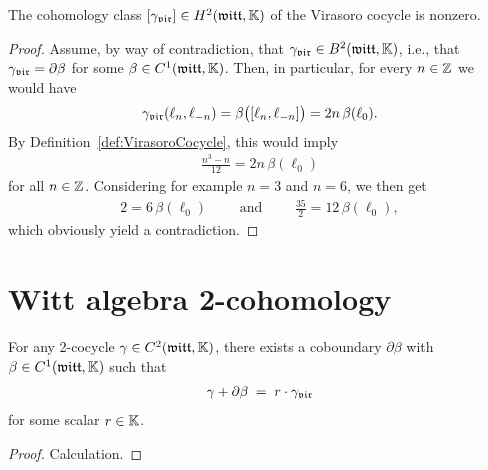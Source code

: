 \begin{lemma}
  \label{lem:VirasoroCocycleNontrivial}
  \leanok
  The cohomology class $[{\gamma}_{\mathfrak{vir}}] \in H^2(\mathfrak{witt},\mathbb{K})$
  of the Virasoro cocycle is nonzero.
\end{lemma}
\begin{proof}
  \leanok
  Assume, by way of contradiction, that ${\gamma}_{\mathfrak{vir}} \in B^2(\mathfrak{witt},\mathbb{K})$,
  i.e., that ${\gamma}_{\mathfrak{vir}} = \partial \beta$ for some $\beta \in C^1(\mathfrak{witt},\mathbb{K})$.
  Then, in particular, for every $n \in \mathbb{Z}$ we would have
  \begin{align*}
    {\gamma}_{\mathfrak{vir}}(\ell_n,\ell_{-n})
      = \beta \big( [\ell_n, \ell_{-n}] \big) = 2 n \, \beta ( \ell_0 ) .
  \end{align*}
  By Definition~\ref{def:VirasoroCocycle}, this would imply
  \begin{align*}
    \frac{n^3-n}{12} = 2 n \, \beta ( \ell_0 )
  \end{align*}
  for all $n \in \mathbb{Z}$. Considering for example $n=3$ and $n=6$, we then get
  \begin{align*}
    2 = 6 \, \beta (\ell_0)
    \qquad \text{ and } \qquad
    \frac{35}{2} = 12 \,  \beta (\ell_0) ,
  \end{align*}
  which obviously yield a contradiction.
\end{proof}

\section{Witt algebra 2-cohomology}

\begin{lemma}
  \label{lem:WittTwoCocycleNormalization}
  \leanok
  For any 2-cocycle $\gamma \in C^2(\mathfrak{witt},\mathbb{K})$, there exists
  a coboundary $\partial \beta$ with $\beta \in C^1(\mathfrak{witt},\mathbb{K})$
  such that
  \begin{align*}
    \gamma + \partial \beta \; = \; r \cdot {\gamma}_{\mathfrak{vir}}
  \end{align*}
  for some scalar $r \in \mathbb{K}$.
\end{lemma}
\begin{proof}
  \leanok
  Calculation.
\end{proof}

